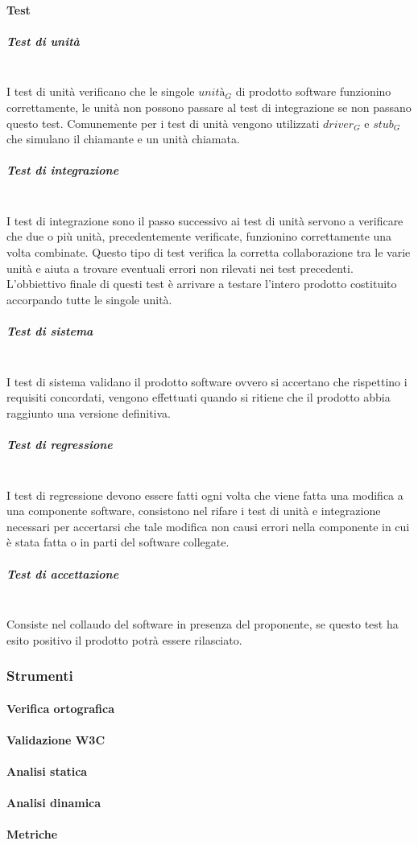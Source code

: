 		\paragraph{Test}
			\subparagraph{Test di unità} \mbox{} \\
			I test di unità verificano che le singole $unità_G$ di prodotto software funzionino correttamente, le unità non possono passare al test di integrazione se non passano questo test.
			Comunemente per i test di unità vengono utilizzati $driver_G$ e $stub_G$ che simulano il chiamante e un unità chiamata.
			\subparagraph{Test di integrazione} \mbox{} \\
			I test di integrazione sono il passo successivo ai test di unità servono a verificare che due o più unità, precedentemente verificate, funzionino correttamente una volta combinate.
			Questo tipo di test verifica la corretta collaborazione tra le varie unità e aiuta a trovare eventuali errori non rilevati nei test precedenti.
			L'obbiettivo finale di questi test è arrivare a testare l'intero prodotto costituito accorpando tutte le singole unità.
			\subparagraph{Test di sistema} \mbox{} \\
			I test di sistema validano il prodotto software ovvero si accertano che rispettino i requisiti concordati, vengono effettuati quando si ritiene che il prodotto abbia raggiunto una versione definitiva.
			\subparagraph{Test di regressione}	\mbox{} \\
			I test di regressione devono essere fatti ogni volta che viene fatta una modifica a una componente software, consistono nel rifare i test di unità e integrazione necessari per accertarsi che tale modifica non causi errori nella componente in cui è stata fatta o in parti del software collegate.				
			\subparagraph{Test di accettazione} \mbox{} \\
			Consiste nel collaudo del software in presenza del proponente, se questo test ha esito positivo il prodotto potrà essere rilasciato.
	\subsubsection{Strumenti}
			\paragraph{Verifica ortografica}
			\paragraph{Validazione W3C}
			\paragraph{Analisi statica}
			\paragraph{Analisi dinamica}
			\paragraph{Metriche}
			
